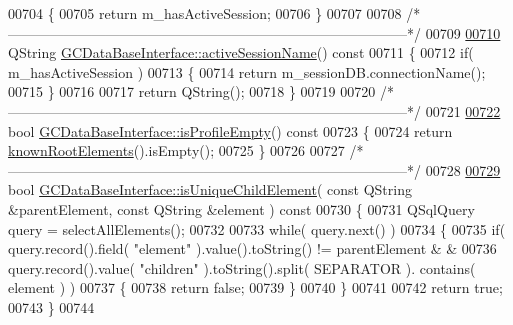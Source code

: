 \begin{DoxyCode}
{{{{{{{{{{{{{{{{{{{{{{{{{{{{{{00704 \textcolor{keyword}{}\{
00705   \textcolor{keywordflow}{return} m\_hasActiveSession;
00706 \}
00707 
00708 \textcolor{comment}{/*
      --------------------------------------------------------------------------------------*/}
00709 
\hypertarget{gcdatabaseinterface_8cpp_source_l00710}{}\hyperlink{class_g_c_data_base_interface_a53aff43e5997c5f0180ba214205e5bc6}{00710} QString \hyperlink{class_g_c_data_base_interface_a53aff43e5997c5f0180ba214205e5bc6}{GCDataBaseInterface::activeSessionName}()\textcolor{keyword}{ const}
00711 \textcolor{keyword}{}\{
00712   \textcolor{keywordflow}{if}( m\_hasActiveSession )
00713   \{
00714     \textcolor{keywordflow}{return} m\_sessionDB.connectionName();
00715   \}
00716 
00717   \textcolor{keywordflow}{return} QString();
00718 \}
00719 
00720 \textcolor{comment}{/*
      --------------------------------------------------------------------------------------*/}
00721 
\hypertarget{gcdatabaseinterface_8cpp_source_l00722}{}\hyperlink{class_g_c_data_base_interface_ae570c403f1b6b7f85e6a5c46829f42a8}{00722} \textcolor{keywordtype}{bool} \hyperlink{class_g_c_data_base_interface_ae570c403f1b6b7f85e6a5c46829f42a8}{GCDataBaseInterface::isProfileEmpty}()\textcolor{keyword}{ const}
00723 \textcolor{keyword}{}\{
00724   \textcolor{keywordflow}{return} \hyperlink{class_g_c_data_base_interface_ac5c57277f9476ab74cfe13fbcee52f15}{knownRootElements}().isEmpty();
00725 \}
00726 
00727 \textcolor{comment}{/*
      --------------------------------------------------------------------------------------*/}
00728 
\hypertarget{gcdatabaseinterface_8cpp_source_l00729}{}\hyperlink{class_g_c_data_base_interface_a94559ea23489e360757db42c50d3a261}{00729} \textcolor{keywordtype}{bool} \hyperlink{class_g_c_data_base_interface_a94559ea23489e360757db42c50d3a261}{GCDataBaseInterface::isUniqueChildElement}( \textcolor{keyword}{const} QString &parentElement, \textcolor{keyword}{
      const} QString &element )\textcolor{keyword}{ const}
00730 \textcolor{keyword}{}\{
00731   QSqlQuery query = selectAllElements();
00732 
00733   \textcolor{keywordflow}{while}( query.next() )
00734   \{
00735     \textcolor{keywordflow}{if}( query.record().field( \textcolor{stringliteral}{"element"} ).value().toString() != parentElement &
      &
00736         query.record().value( \textcolor{stringliteral}{"children"} ).toString().split( SEPARATOR ).
      contains( element ) )
00737     \{
00738       \textcolor{keywordflow}{return} \textcolor{keyword}{false};
00739     \}
00740   \}
00741 
00742   \textcolor{keywordflow}{return} \textcolor{keyword}{true};
00743 \}
00744 
}}}}}}}}}}}}}}}}}}}}}}}}}}}}}}
\end{DoxyCode}
